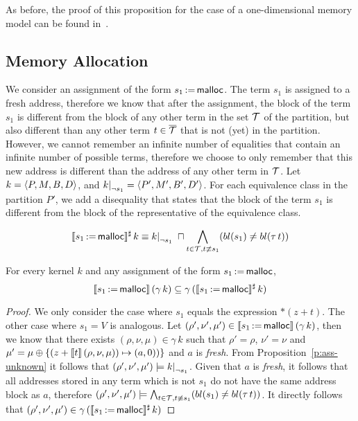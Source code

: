 As before, the proof of this proposition for the case of a one-dimensional memory model can be found in~\cite{2pointer}.

\subsection{Memory Allocation}

We consider an assignment of the form $s_1\,{:=}\,\textsf{malloc}$.
The term $s_1$ is assigned to a fresh address, therefore we know that after the assignment,
the block of the term $s_1$ is different from the block of any other term in the set $\mathcal{T}$ of the partition,
but also different than any other term $t \in {\overline{\mathcal{T}}}$ that is not (yet) in the partition.
However, we cannot remember an infinite number of equalities that contain an infinite number of possible terms,
therefore we choose to only remember that this new address is different than the address of any other term in $\mathcal{T}$.
Let $k = \langle P, M, B,D\rangle$, and $\restr{k}{\neg s_1} = \angl{P', M', B', D'}$.
For each equivalence class in the partition $P'$, we add a disequality that states
that the block of the term $s_1$ is different from the block of the representative of the equivalence class.

\[
	\sem{s_1\,{:=}\,\text{\malloc}}^\sharp\,k \equiv
	\restr{k}{\neg s_1}\;\meet
	\bigwedge_{t\in \T, t \nequiv s_1}(bl(s_1) \neq bl(\tau\,t))
\]

\begin{proposition}\label{p:ass-malloc}
	For every kernel $k$ and any assignment of the form $s_1\,{:=}\,\textsf{malloc}$,
	\[
		\llbracket s_1\,{:=}\,\textsf{malloc}\rrbracket\,(\gamma\,k) \subseteq \gamma\,(\llbracket s_1\,{:=}\,\textsf{malloc}\rrbracket^\sharp\,k)
	\]
\end{proposition}

\begin{proof}
	We only consider the case where $s_1$ equals the expression $*(z+t)$.
	The other case where $s_1 = V$ is analogous.
	Let $(\rho',\nu',\mu') \in \llbracket s_1\,{:=}\,\textsf{malloc}\rrbracket\,(\gamma\,k)$, then we know that there exists $(\rho,\nu,\mu) \in \gamma\,k$ such that $\rho'=\rho$, $\nu'=\nu$ and $\mu' =\mu\oplus\{(z+\llbracket t\rrbracket\,(\rho,\nu,\mu))\mapsto (a,0))\}$ and $a$ is \emph{fresh}.
	From Proposition~\ref{p:ass-unknown} it follows that $(\rho',\nu',\mu') \models \restr{k}{\neg s_1}$.
	Given that $a$ is \emph{fresh}, it follows that all addresses stored in any term which is not $s_1$ do not have the same address block as $a$, therefore $(\rho',\nu',\mu') \models \bigwedge_{t\in \mathcal{T}, t \not\equiv s_1}(bl(s_1) \neq bl(\tau\,t))$.
	It directly follows that $(\rho',\nu',\mu') \in \gamma\,(\llbracket s_1\,{:=}\,\textsf{malloc}\rrbracket^\sharp\,k)$
\end{proof}
